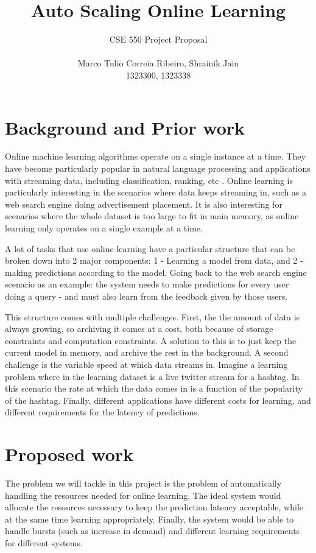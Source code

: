 \documentclass[letterpaper]{article}
\title{Auto Scaling Online Learning}
\date{}
\begin{document}
\author{CSE 550 Project Proposal \\\\ Marco Tulio Correia Ribeiro, Shrainik Jain\\ 1323300, 1323338}
\maketitle

\section{Background and Prior work}
Online machine learning algorithms operate on a single instance at a time. They
have become particularly popular in natural language processing and applications
with streaming data, including classification, ranking, etc
\cite{Bordes:2005:HSE:2130928.2130979,
Carvalho:2006:SOL:1150402.1150466, Dredze:2008:CLC:1390156.1390190}. Online
learning is particularly interesting in the scenarios where data keeps streaming
in, such as a web search engine doing advertisement placement. It is also
interesting for scenarios where the whole dataset is too large to fit in main
memory, as online learning only operates on a single example at a time.

A lot of tasks that use online learning have a particular structure that can be 
broken down into 2 major components: 1 - Learning a model from data, and 2 -
making predictions according to the model. Going back to the web search engine
scenario as an example: the system needs to make predictions for every user
doing a query - and must also learn from the feedback given by those users.

This structure comes with multiple challenges. First, the 
the amount of data is always growing, so archiving it comes at a cost, both
because of storage constraints and computation constraints. A solution to this
is to just keep the current model in memory, and archive the rest in the
background. A second challenge is the
variable speed at which data streams in. Imagine a learning problem where in the
learning dataset is a live twitter stream for a hashtag. In this scenario the
rate at which the data comes in is a function of the popularity of the hashtag.
Finally, different applications have different costs for learning, and different
requirements for the latency of predictions.

\section{Proposed work}
The problem we will tackle in this project is the problem of automatically
handling the resources needed for online learning. The ideal system would
allocate the resources necessary to keep the prediction latency acceptable,
while at the same time learning appropriately. Finally, the system would be able
to handle bursts (such as increase in demand) and different learning
requirements for different systems.
\end{document}
